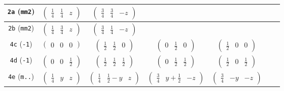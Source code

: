 \documentclass[fleqn,9pt,landscape]{jsarticle}
\begin{document}
\begin{center}
\begin{longtable}{ccccccc}
{\tt 2a} ({\tt mm2}) & $ \begin{pmatrix} \frac{1}{4} & \frac{1}{4} & z \end{pmatrix} $ & $ \begin{pmatrix} \frac{3}{4} & \frac{3}{4} & - z \end{pmatrix} $ & $  $ & $  $ & $  $ & $  $ \\ \hline
{\tt 2b} ({\tt mm2}) & $ \begin{pmatrix} \frac{1}{4} & \frac{3}{4} & z \end{pmatrix} $ & $ \begin{pmatrix} \frac{3}{4} & \frac{1}{4} & - z \end{pmatrix} $ & $  $ & $  $ & $  $ & $  $ \\ \hline
{\tt 4c} ({\tt -1}) & $ \begin{pmatrix} 0 & 0 & 0 \end{pmatrix} $ & $ \begin{pmatrix} \frac{1}{2} & \frac{1}{2} & 0 \end{pmatrix} $ & $ \begin{pmatrix} 0 & \frac{1}{2} & 0 \end{pmatrix} $ & $ \begin{pmatrix} \frac{1}{2} & 0 & 0 \end{pmatrix} $ & $  $ & $  $ \\ \hline
{\tt 4d} ({\tt -1}) & $ \begin{pmatrix} 0 & 0 & \frac{1}{2} \end{pmatrix} $ & $ \begin{pmatrix} \frac{1}{2} & \frac{1}{2} & \frac{1}{2} \end{pmatrix} $ & $ \begin{pmatrix} 0 & \frac{1}{2} & \frac{1}{2} \end{pmatrix} $ & $ \begin{pmatrix} \frac{1}{2} & 0 & \frac{1}{2} \end{pmatrix} $ & $  $ & $  $ \\ \hline
{\tt 4e} ({\tt m..}) & $ \begin{pmatrix} \frac{1}{4} & y & z \end{pmatrix} $ & $ \begin{pmatrix} \frac{1}{4} & \frac{1}{2} - y & z \end{pmatrix} $ & $ \begin{pmatrix} \frac{3}{4} & y + \frac{1}{2} & - z \end{pmatrix} $ & $ \begin{pmatrix} \frac{3}{4} & - y & - z \end{pmatrix} $ & $  $ & $  $ \\ \hline

\end{longtable}
\end{center}
\end{document}

